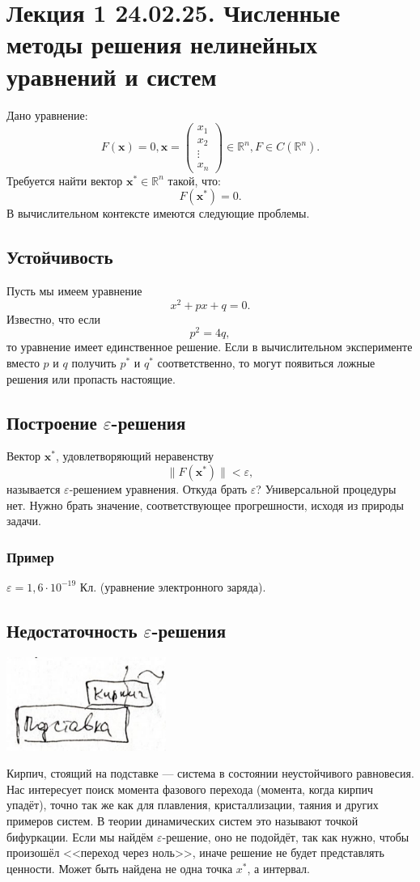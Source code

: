 \section{Лекция 1 24.02.25. Численные методы решения нелинейных уравнений и систем}
Дано уравнение:
\[
F(\mathbf{x}) = 0, \mathbf{x} = \begin{pmatrix} 
x_1    \\ 
x_2    \\ 
\vdots \\ 
x_n    
\end{pmatrix} \in \mathbb{R}^n, F \in C(\mathbb{R}^n).
\]
Требуется найти вектор $\mathbf{x^*} \in \mathbb{R}^n$ такой, что:
\[
F(\mathbf{x^*}) = 0.
\]
В вычислительном контексте имеются следующие проблемы.
\subsection{Устойчивость}
Пусть мы имеем уравнение
\[
x^2 + px + q = 0.
\]
Известно, что если
\[
p^2 = 4q,
\]
то уравнение имеет единственное решение.
Если в вычислительном эксперименте вместо $p$ и $q$ получить $p^*$ и $q^*$ соответственно, то могут появиться ложные решения или пропасть настоящие.
\subsection{Построение $\varepsilon$-решения}
Вектор $\mathbf{x^*}$, удовлетворяющий неравенству
\[
\|F(\mathbf{x^*})\| < \varepsilon,
\]
называется $\varepsilon$-решением уравнения.
Откуда брать $\varepsilon$? Универсальной процедуры нет. Нужно брать значение, соответствующее прогрешности, исходя из природы задачи.
\subsubsection{Пример} 
$\varepsilon = 1,6 \cdot 10^{-19}$ Кл. (уравнение электронного заряда).
\subsection{Недостаточность $\varepsilon$-решения}
\begin{center}
    \includegraphics[width=5.2cm]{../figures/lection_1/figure_1.png}
\end{center}
Кирпич, стоящий на подставке --- система в состоянии неустойчивого равновесия. Нас интересует поиск момента фазового перехода (момента, когда кирпич упадёт), точно так же как для плавления, кристаллизации, таяния и других примеров систем. В теории динамических систем это называют точкой бифуркации. Если мы найдём $\varepsilon$-решение, оно не подойдёт, так как нужно, чтобы произошёл <<переход через ноль>>, иначе решение не будет представлять ценности. Может быть найдена не одна точка $x^*$, а интервал.
